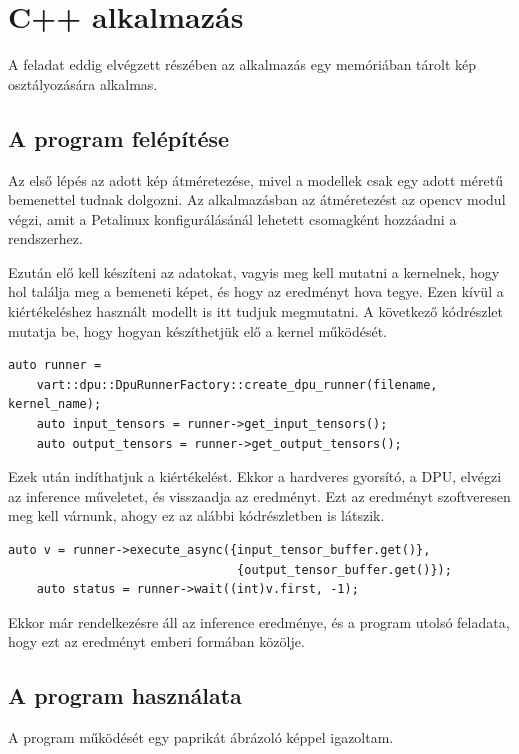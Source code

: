 \section{C++ alkalmazás}
A feladat eddig elvégzett részében az alkalmazás egy memóriában tárolt kép osztályozására alkalmas.

\subsection{A program felépítése}

Az első lépés az adott kép átméretezése, mivel a modellek csak egy adott méretű bemenettel tudnak dolgozni. Az alkalmazásban az átméretezést az opencv modul végzi, amit a Petalinux konfigurálásánál lehetett csomagként hozzáadni a rendszerhez.

Ezután elő kell készíteni az adatokat, vagyis meg kell mutatni a kernelnek, hogy hol találja meg a bemeneti képet, és hogy az eredményt hova tegye. Ezen kívül a kiértékeléshez használt modellt is itt tudjuk megmutatni. A következő kódrészlet mutatja be, hogy hogyan készíthetjük elő a kernel működését.

\begin{lstlisting}[frame=single,float=!ht]
    auto runner =
    vart::dpu::DpuRunnerFactory::create_dpu_runner(filename, kernel_name);
    auto input_tensors = runner->get_input_tensors();
    auto output_tensors = runner->get_output_tensors();
\end{lstlisting}

Ezek után indíthatjuk a kiértékelést. Ekkor a hardveres gyorsító, a DPU, elvégzi az inference műveletet, és visszaadja az eredményt. Ezt az eredményt szoftveresen meg kell várnunk, ahogy ez az alábbi kódrészletben is látszik.

\begin{lstlisting}[frame=single,float=!ht]
    auto v = runner->execute_async({input_tensor_buffer.get()},
                                {output_tensor_buffer.get()});
    auto status = runner->wait((int)v.first, -1);
\end{lstlisting}

Ekkor már rendelkezésre áll az inference eredménye, és a program utolsó feladata, hogy ezt az eredményt emberi formában közölje.

\subsection{A program használata}
A program működését egy paprikát ábrázoló képpel igazoltam.

